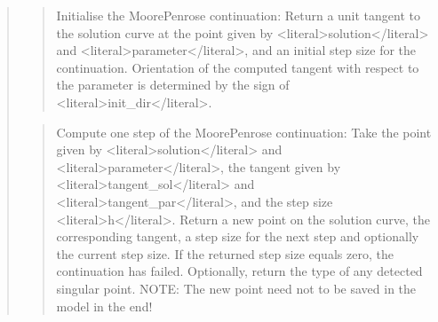 \documentclass[a4paper,11pt,english]{sphinxmanual}
\begin{document}
\begin{quote}
\sphinxAtStartPar
{}
\begin{quote}

\sphinxAtStartPar
Initialise the Moore\sphinxhyphen{}Penrose continuation: Return a unit tangent to
the solution curve at the point given by \textless{}literal\textgreater{}solution\textless{}/literal\textgreater{} and \textless{}literal\textgreater{}parameter\textless{}/literal\textgreater{},
and an initial step size for the continuation. Orientation of the
computed tangent with respect to the parameter is determined by the
sign of \textless{}literal\textgreater{}init\_dir\textless{}/literal\textgreater{}.
\end{quote}

\sphinxAtStartPar
{}
\begin{quote}

\sphinxAtStartPar
Compute one step of the Moore\sphinxhyphen{}Penrose continuation: Take the point
given by \textless{}literal\textgreater{}solution\textless{}/literal\textgreater{} and \textless{}literal\textgreater{}parameter\textless{}/literal\textgreater{}, the tangent given by \textless{}literal\textgreater{}tangent\_sol\textless{}/literal\textgreater{}
and \textless{}literal\textgreater{}tangent\_par\textless{}/literal\textgreater{}, and the step size \textless{}literal\textgreater{}h\textless{}/literal\textgreater{}. Return a new point on the
solution curve, the corresponding tangent, a step size for the next
step and optionally the current step size. If the returned step
size equals zero, the continuation has failed. Optionally, return
the type of any detected singular point.
NOTE: The new point need not to be saved in the model in the end!
\end{quote}

\sphinxAtStartPar
{}
\begin{quote}


\end{quote}
\end{quote}
\end{document}
